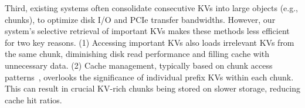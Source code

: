 
Third, existing systems often consolidate consecutive KVs into large objects
(e.g., chunks), to optimize disk I/O and PCIe transfer bandwidths.
However, our system's selective retrieval of important KVs makes these methods
less efficient for two key reasons. (1) Accessing important KVs also loads irrelevant KVs from the same chunk, diminishing disk read performance and filling cache with unnecessary data.
(2) Cache management, typically based on chunk access
patterns~\cite{sglang-arxiv23, cacheblend-arxiv24, ragcache-arxiv24}, overlooks
the significance of individual prefix KVs within each chunk. This can result in crucial KV-rich
chunks being stored on slower storage, reducing cache hit ratios.


